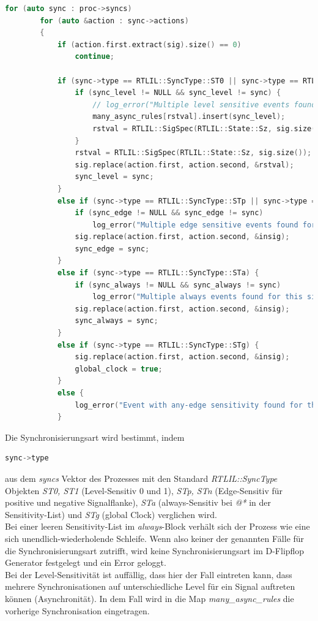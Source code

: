 \documentclass[11pt]{report}
\begin{document}
\begin{enumerate}
\begin{lstlisting}[language=C++]
		for (auto sync : proc->syncs)
		for (auto &action : sync->actions)
		{
			if (action.first.extract(sig).size() == 0)
				continue;

			if (sync->type == RTLIL::SyncType::ST0 || sync->type == RTLIL::SyncType::ST1) {
				if (sync_level != NULL && sync_level != sync) {
					// log_error("Multiple level sensitive events found for this signal!\n");
					many_async_rules[rstval].insert(sync_level);
					rstval = RTLIL::SigSpec(RTLIL::State::Sz, sig.size());
				}
				rstval = RTLIL::SigSpec(RTLIL::State::Sz, sig.size());
				sig.replace(action.first, action.second, &rstval);
				sync_level = sync;
			}
			else if (sync->type == RTLIL::SyncType::STp || sync->type == RTLIL::SyncType::STn) {
				if (sync_edge != NULL && sync_edge != sync)
					log_error("Multiple edge sensitive events found for this signal!\n");
				sig.replace(action.first, action.second, &insig);
				sync_edge = sync;
			}
			else if (sync->type == RTLIL::SyncType::STa) {
				if (sync_always != NULL && sync_always != sync)
					log_error("Multiple always events found for this signal!\n");
				sig.replace(action.first, action.second, &insig);
				sync_always = sync;
			}
			else if (sync->type == RTLIL::SyncType::STg) {
				sig.replace(action.first, action.second, &insig);
				global_clock = true;
			}
			else {
				log_error("Event with any-edge sensitivity found for this signal!\n");
			}
\end{lstlisting}
Die Synchronisierungsart wird bestimmt, indem 
\begin{lstlisting}[language=C++]
sync->type
\end{lstlisting}
aus dem \textit{syncs} Vektor des Prozesses mit den Standard \textit{RTLIL::SyncType} Objekten \textit{ST0, ST1} (Level-Sensitiv 0 und 1), \textit{STp, STn} (Edge-Sensitiv für positive und negative Signalflanke), \textit{STa} (always-Sensitiv bei \textit{@*} in der Sensitivity-List) und \textit{STg} (global Clock) verglichen wird.\\
Bei einer leeren Sensitivity-List im \textit{always}-Block verhält sich der Prozess wie eine sich unendlich-wiederholende Schleife. Wenn also keiner der genannten Fälle für die Synchronisierungsart zutrifft, wird keine Synchronisierungsart im D-Flipflop Generator festgelegt und ein Error geloggt.\\
Bei der Level-Sensitivität ist auffällig, dass hier der Fall eintreten kann, dass mehrere Synchronisationen auf unterschiedliche Level für ein Signal auftreten können (Asynchronität). In dem Fall wird in die Map \textit{many\_async\_rules} die vorherige Synchronisation eingetragen.

\end{enumerate}
\end{document}
